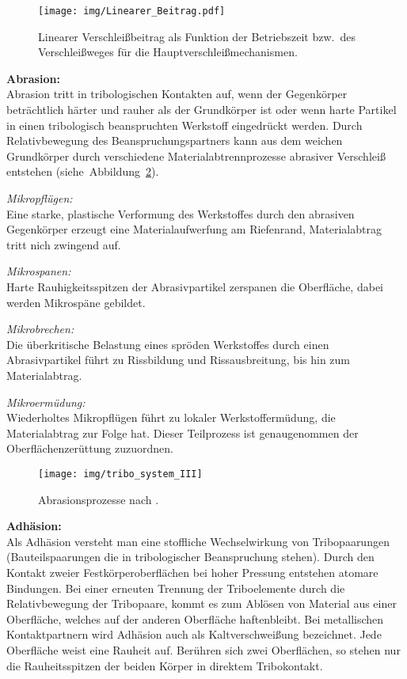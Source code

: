 \documentclass[12pt,a4paper,bibliography=totocnumbered,listof=totocnumbered,fleqn]{scrartcl}
\begin{document}
\begin{figure}[h]
\centering
\texttt{[image: img/Linearer\_Beitrag.pdf]}
\caption{Linearer Verschleißbeitrag als Funktion der Betriebszeit bzw.\ des Verschleißweges für die Hauptverschleißmechanismen.}
\label{fig:verschleissbeitrag}
\end{figure}

\pagebreak

\textbf{Abrasion:}\\
Abrasion tritt in tribologischen Kontakten auf, wenn der Gegenkörper beträchtlich härter und rauher als der Grundkörper ist oder wenn harte Partikel in einen tribologisch beanspruchten Werkstoff eingedrückt werden. Durch Relativbewegung des Beanspruchungspartners kann aus dem weichen Grundkörper durch verschiedene Materialabtrennprozesse abrasiver Verschleiß entstehen (siehe~Abbildung~\ref{fig:abrasionsprozesse}).

\textit{Mikropflügen:}\\
Eine starke, plastische Verformung des Werkstoffes durch den abrasiven Gegenkörper erzeugt eine Materialaufwerfung am Riefenrand, Materialabtrag tritt nich zwingend auf.

\textit{Mikrospanen:}\\
Harte Rauhigkeitsspitzen der Abrasivpartikel zerspanen die Oberfläche, dabei werden Mikrospäne gebildet.

\textit{Mikrobrechen:}\\
Die überkritische Belastung eines spröden Werkstoffes durch einen Abrasivpartikel führt zu Rissbildung und Rissausbreitung, bis hin zum Materialabtrag.

\textit{Mikroermüdung:}\\
Wiederholtes Mikropflügen führt zu lokaler Werkstoffermüdung, die Materialabtrag zur Folge hat.
Dieser Teilprozess ist genaugenommen der Oberflächenzerüttung zuzuordnen.

\begin{figure}[h]
\centering
\texttt{[image: img/tribo\_system\_III]}
\caption{Abrasionsprozesse nach \citep{bobzin2013oberflchentechnik}.}
\label{fig:abrasionsprozesse}
\end{figure}

\pagebreak

\textbf{Adhäsion:}\\
Als Adhäsion versteht man eine stoffliche Wechselwirkung von Tribopaarungen (Bauteilspaarungen die in tribologischer Beanspruchung stehen).
Durch den Kontakt zweier Festkörperoberflächen bei hoher Pressung entstehen atomare Bindungen.
Bei einer erneuten Trennung der Triboelemente durch die Relativbewegung der Tribopaare, kommt es zum Ablösen von Material aus einer Oberfläche, welches auf der anderen Oberfläche haftenbleibt.
Bei metallischen Kontaktpartnern wird Adhäsion auch als Kaltverschweißung bezeichnet.
Jede Oberfläche weist eine Rauheit auf.
Berühren sich zwei Oberflächen, so stehen nur die Rauheitsspitzen der beiden Körper in direktem Tribokontakt.
\end{document}
